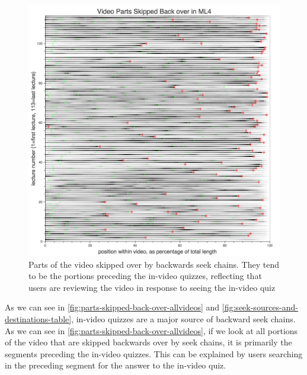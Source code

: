 \documentclass{sigchi}
\begin{document}
\begin{figure}
\includegraphics[width=1.0\columnwidth]{parts-skipped-back-over-allvideos}
\caption{Parts of the video skipped over by backwards seek chains. They tend to be the portions preceding the in-video quizzes, reflecting that users are reviewing the video in response to seeing the in-video quiz}
\label{fig:parts-skipped-back-over-allvideos}
\end{figure}

As we can see in \autoref{fig:parts-skipped-back-over-allvideos} and \autoref{fig:seek-sources-and-destinations-table}, in-video quizzes are a major source of backward seek chains. As we can see in \autoref{fig:parts-skipped-back-over-allvideos}, if we look at all portions of the video that are skipped backwards over by seek chains, it is primarily the segments preceding the in-video quizzes. This can be explained by users searching in the preceding segment for the answer to the in-video quiz. %
\end{document}
